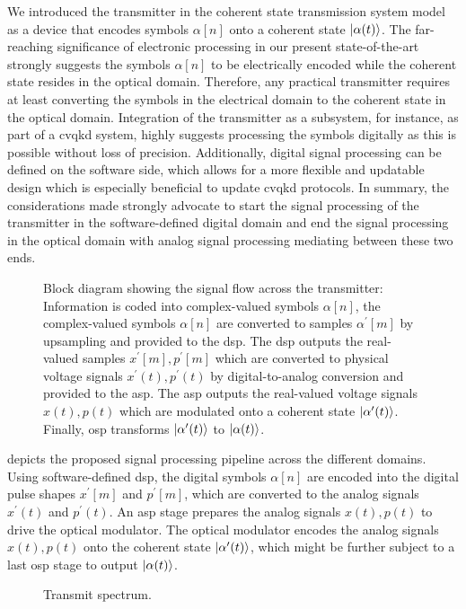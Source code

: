 We introduced the transmitter in the coherent state transmission system model as a device that encodes symbols $\alpha[n]$ onto a coherent state $\lvert\alpha(t)\rangle$.
The far-reaching significance of electronic processing in our present state-of-the-art strongly suggests the symbols $\alpha[n]$ to be electrically encoded while the coherent state resides in the optical domain.
Therefore, any practical transmitter requires at least converting the symbols in the electrical domain to the coherent state in the optical domain.
Integration of the transmitter as a subsystem, for instance, as part of a \gls{cvqkd} system, highly suggests processing the symbols digitally as this is possible without loss of precision.
Additionally, digital signal processing can be defined on the software side, which allows for a more flexible and updatable design which is especially beneficial to update \gls{cvqkd} protocols.
In summary, the considerations made strongly advocate to start the signal processing of the transmitter in the software-defined digital domain and end the signal processing in the optical domain with analog signal processing mediating between these two ends.
\begin{figure}[htb]
	\centering
	
	\caption{Block diagram showing the signal flow across the transmitter: Information is coded into complex-valued symbols $\alpha[n]$, the complex-valued symbols $\alpha[n]$ are converted to samples $\alpha^\prime[m]$ by upsampling and provided to the \gls{dsp}. The \gls{dsp} outputs the real-valued samples $x^\prime[m],p^\prime[m]$ which are converted to physical voltage signals $x^\prime(t),p^\prime(t)$ by digital-to-analog conversion and provided to the \gls{asp}. The \gls{asp} outputs the real-valued voltage signals $x(t),p(t)$ which are modulated onto a coherent state $\lvert\alpha^\prime(t)\rangle$. Finally, \gls{osp} transforms $\lvert\alpha^\prime(t)\rangle$ to $\lvert\alpha(t)\rangle$.}\label{fig:transmitter}
\end{figure}
 depicts the proposed signal processing pipeline across the different domains.
Using software-defined \gls{dsp}, the digital symbols $\alpha[n]$ are encoded into the digital pulse shapes $x^\prime[m]$ and $p^\prime[m]$, which are converted to the analog signals $x^\prime(t)$ and $p^\prime(t)$.
An \gls{asp} stage prepares the analog signals $x(t),p(t)$ to drive the optical modulator.
The optical modulator encodes the analog signals $x(t), p(t)$ onto the coherent state $\lvert\alpha^\prime(t)\rangle$, which might be further subject to a last \gls{osp} stage to output $\lvert\alpha(t)\rangle$.
\begin{figure}[htb]
	\centering
	
	\caption{Transmit spectrum.}\label{fig:transmit_spectrum}
\end{figure}

